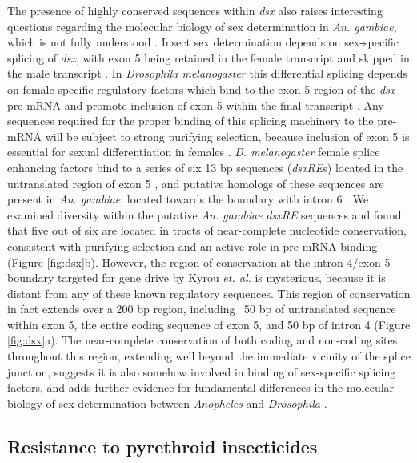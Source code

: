 \documentclass[a4paper,11pt,abstracton,hidelinks]{scrartcl}
\begin{document}
The presence of highly conserved sequences within \textit{dsx} also raises interesting questions regarding the molecular biology of sex determination in \textit{An. gambiae}, which is not fully understood \cite{Scali2005, Krzywinska2016}.
%
Insect sex determination depends on sex-specific splicing of \textit{dsx}, with exon 5 being retained in the female transcript and skipped in the male transcript \cite{Gempe2011}.
%
In \textit{Drosophila melanogaster} this differential splicing depends on female-specific regulatory factors which bind to the exon 5 region of the \textit{dsx} pre-mRNA and promote inclusion of exon 5 within the final transcript \cite{Cline1996, Gempe2011}.
%
Any sequences required for the proper binding of this splicing machinery to the pre-mRNA will be subject to strong purifying selection, because inclusion of exon 5 is essential for sexual differentiation in females \cite{Cline1996, kyrou2018}. 
%
\textit{D. melanogaster} female splice enhancing factors bind to a series of six 13 bp sequences (\textit{dsxRE}s) located in the untranslated region of exon 5 \cite{Cline1996}, and putative homologs of these sequences are present in \textit{An. gambiae}, located towards the boundary with intron 6 \cite{Scali2005}.
%
We examined diversity within the putative \textit{An. gambiae} \textit{dsxRE} sequences and found that five out of six are located in tracts of near-complete nucleotide conservation, consistent with purifying selection and an active role in pre-mRNA binding (Figure \ref{fig:dsx}b).
%
However, the region of conservation at the intron 4/exon 5 boundary targeted for gene drive by Kyrou \textit{et. al.} \cite{kyrou2018} is mysterious, because it is distant from any of these known regulatory sequences.
%
This region of conservation in fact extends over a 200 bp region, including ~50 bp of untranslated sequence within exon 5, the entire coding sequence of exon 5, and 50 bp of intron 4 (Figure \ref{fig:dsx}a).
%
The near-complete conservation of both coding and non-coding sites throughout this region, extending well beyond the immediate vicinity of the splice junction, suggests it is also somehow involved in binding of sex-specific splicing factors, and adds further evidence for fundamental differences in the molecular biology of sex determination between \textit{Anopheles} and \textit{Drosophila} \cite{Scali2005, Krzywinska2016}. 
%


\subsection*{Resistance to pyrethroid insecticides}
\end{document}
